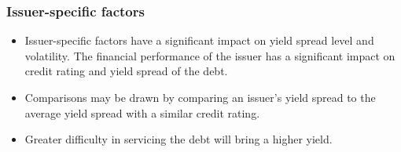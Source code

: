 \documentclass[../notes_compiled.tex]{subfiles}
\begin{document}
\subsubsection*{Issuer-specific factors}
\begin{itemize}
\item Issuer-specific factors have a significant impact on yield spread level and volatility. The financial performance of the issuer has a significant impact on credit rating and yield spread of the debt.
\item Comparisons may be drawn by comparing an issuer’s yield spread to the average yield spread with a similar credit rating.
\item Greater difficulty in servicing the debt will bring a higher yield.
\end{itemize}
\end{document}
